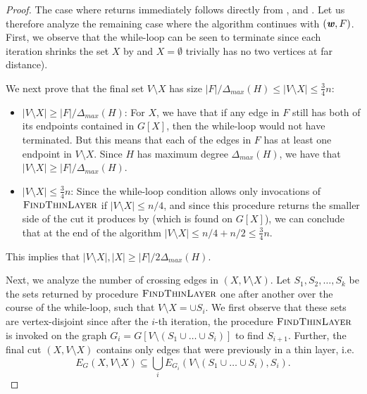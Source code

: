 \begin{proof}%
The case where  returns immediately follows directly from ,  and .
Let us therefore analyze the remaining case where the algorithm continues with $(\boldsymbol{\mathit{w}}, F)$.  First, we observe that the while-loop can be seen to terminate since each iteration shrinks the set $X$ by  and $X = \emptyset$ trivially has no two vertices at far distance). 

We next prove that the final set $V \setminus X$ has size $|F|/\Delta_{max}(H) \leq |V \setminus X| \leq \frac{3}{4}n$:
\begin{itemize}
    \item $|V \setminus X| \geq |F|/\Delta_{max}(H)$: For $X$, we have that if any edge in $F$ still has both of its endpoints contained in $G[X]$, then the while-loop would not have terminated. But this means that each of the edges in $F$ has at least one endpoint in $V \setminus X$. Since $H$ has maximum degree $\Delta_{max}(H)$, we have that $|V \setminus X| \geq |F|/\Delta_{max}(H)$. 
    
    \item $|V \setminus X| \leq \frac{3}{4}n$: Since the while-loop condition allows only invocations of $\textsc{FindThinLayer}$ if $|V \setminus X| \leq n/4$, and since this procedure returns the smaller side of the cut it produces by  (which is found on $G[X]$), we can conclude that at the end of the algorithm $|V \setminus X| \leq n/4 + n/2 \leq \frac{3}{4}n$.
\end{itemize}
This implies that $|V \setminus X|, |X| \geq |F|/2\Delta_{max}(H)$.

Next, we analyze the number of crossing edges in $(X, V \setminus X).$
Let $S_1, S_2, \ldots, S_k$ be the sets returned by procedure $\textsc{FindThinLayer}$ one after another over the course of the while-loop, such that $V \setminus X = \cup S_i$. We first observe that these sets are vertex-disjoint since after the $i$-th iteration, the procedure $\textsc{FindThinLayer}$ is invoked on the graph $G_i = G[V \setminus (S_1 \cup \ldots \cup S_i)]$ to find $S_{i+1}$.
Further, the final cut $(X, V \setminus X)$ contains only edges that were previously in a thin layer, i.e. \[
E_G(X, V \setminus X) \subseteq \bigcup_i E_{G_i}(V \setminus (S_1 \cup \ldots \cup S_i), S_i).
\]


\end{proof}
